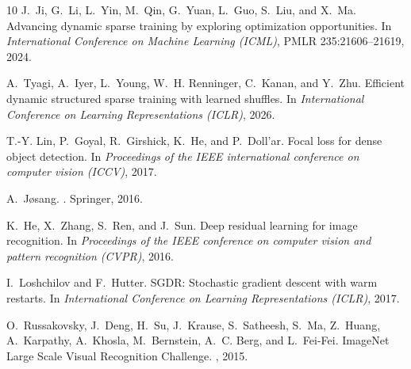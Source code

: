 \documentclass[letterpaper]{article}
\newif\ifwithappendix
\begin{document}
\begin{thebibliography}{10}
J.~Ji, G.~Li, L.~Yin, M.~Qin, G.~Yuan, L.~Guo, S.~Liu, and X.~Ma.
\newblock Advancing dynamic sparse training by exploring optimization opportunities.
\newblock In {\em International Conference on Machine Learning (ICML)}, PMLR 235:21606--21619, 2024.

A.~Tyagi, A.~Iyer, L.~Young, W.~H. Renninger, C.~Kanan, and Y.~Zhu.
\newblock Efficient dynamic structured sparse training with learned shuffles.
\newblock In {\em International Conference on Learning Representations (ICLR)}, 2026.


T.-Y. Lin, P.~Goyal, R.~Girshick, K.~He, and P.~Doll{'a}r.
\newblock Focal loss for dense object detection.
\newblock In {\em Proceedings of the IEEE international conference on computer vision (ICCV)}, 2017.

A.~J{\o}sang.
.
\newblock Springer, 2016.

K.~He, X.~Zhang, S.~Ren, and J.~Sun.
\newblock Deep residual learning for image recognition.
\newblock In {\em Proceedings of the IEEE conference on computer vision and pattern recognition (CVPR)}, 2016.

I.~Loshchilov and F.~Hutter.
\newblock SGDR: Stochastic gradient descent with warm restarts.
\newblock In {\em International Conference on Learning Representations (ICLR)}, 2017.

O.~Russakovsky, J.~Deng, H.~Su, J.~Krause, S.~Satheesh, S.~Ma, Z.~Huang, A.~Karpathy, A.~Khosla, M.~Bernstein, A.~C. Berg, and L.~Fei-Fei.
\newblock ImageNet Large Scale Visual Recognition Challenge.
, 2015.

\end{thebibliography}

\ifwithappendix
\appendix

\setcounter{topnumber}{4}
\setcounter{bottomnumber}{2}
\renewcommand{\topfraction}{0.95}
\renewcommand{\bottomfraction}{0.80}
\renewcommand{\textfraction}{0.05}
\renewcommand{\floatpagefraction}{0.75}
\setlength{\textfloatsep}{4pt plus 1pt minus 1pt}
\setlength{\floatsep}{3pt plus 1pt minus 1pt}
\setlength{\intextsep}{4pt plus 1pt minus 1pt}
\end{document}
